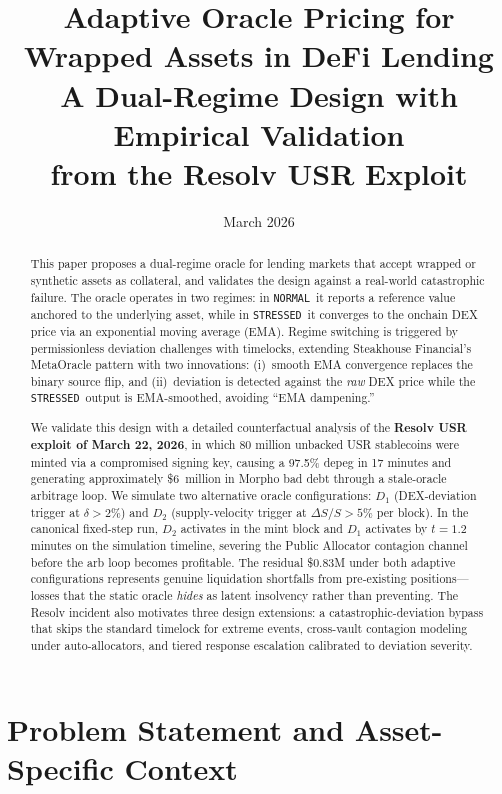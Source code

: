 \documentclass[11pt]{article}
\title{\textbf{Adaptive Oracle Pricing for Wrapped Assets in DeFi Lending}\\
\large A Dual-Regime Design with Empirical Validation\\from the Resolv USR Exploit}
\date{March 2026}
\newcommand{\NORMAL}{\texttt{NORMAL}}
\newcommand{\STRESSED}{\texttt{STRESSED}}
\begin{document}
\maketitle

\begin{abstract}
This paper proposes a dual-regime oracle for lending markets that accept wrapped or synthetic assets as collateral, and validates the design against a real-world catastrophic failure. The oracle operates in two regimes: in \NORMAL\ it reports a reference value anchored to the underlying asset, while in \STRESSED\ it converges to the onchain DEX price via an exponential moving average (EMA). Regime switching is triggered by permissionless deviation challenges with timelocks, extending Steakhouse Financial's MetaOracle pattern with two innovations: (i)~smooth EMA convergence replaces the binary source flip, and (ii)~deviation is detected against the \emph{raw} DEX price while the \STRESSED\ output is EMA-smoothed, avoiding ``EMA dampening.''

We validate this design with a detailed counterfactual analysis of the \textbf{Resolv USR exploit of March 22, 2026}, in which 80 million unbacked USR stablecoins were minted via a compromised signing key, causing a 97.5\% depeg in 17 minutes and generating approximately \$6~million in Morpho bad debt through a stale-oracle arbitrage loop. We simulate two alternative oracle configurations: $D_1$ (DEX-deviation trigger at $\delta > 2\%$) and $D_2$ (supply-velocity trigger at $\Delta S / S > 5\%$ per block). In the canonical fixed-step run, $D_2$ activates in the mint block and $D_1$ activates by $t=1.2$ minutes on the simulation timeline, severing the Public Allocator contagion channel before the arb loop becomes profitable. The residual \$0.83M under both adaptive configurations represents genuine liquidation shortfalls from pre-existing positions---losses that the static oracle \emph{hides} as latent insolvency rather than preventing. The Resolv incident also motivates three design extensions: a catastrophic-deviation bypass that skips the standard timelock for extreme events, cross-vault contagion modeling under auto-allocators, and tiered response escalation calibrated to deviation severity.
\end{abstract}

\tableofcontents
\newpage

\section{Problem Statement and Asset-Specific Context}
\end{document}
